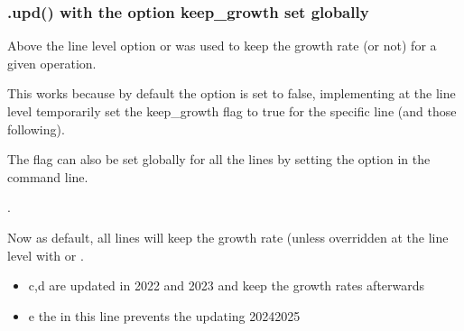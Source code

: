 \documentclass[letterpaper,10pt,english]{jupyterBook}
\begin{document}
\subsubsection{.upd() with the option keep\_growth set globally}
\label{\detokenize{content/04_PythonEssentials/UpdateCommand:upd-with-the-option-keep-growth-set-globally}}
\sphinxAtStartPar
Above the line level option  or  was used to keep the growth rate (or not) for a given operation.

\sphinxAtStartPar
This works because by default the option  is set to false, implementing  at the line level temporarily set the keep\_growth flag to  true for the specific line (and those following).

\sphinxAtStartPar
The  flag can also be set globally for all the lines by setting the option in the command line.

\sphinxAtStartPar
{}.

\sphinxAtStartPar
Now as default, all lines will keep the growth rate (unless overridden at the line level with  or .
\begin{itemize}
\item {} 
\sphinxAtStartPar
c,d are updated in 2022 and 2023 and keep the growth rates afterwards

\item {} 
\sphinxAtStartPar
e the  in this line prevents the updating 2024\sphinxhyphen{}2025

\end{itemize}
\end{document}
